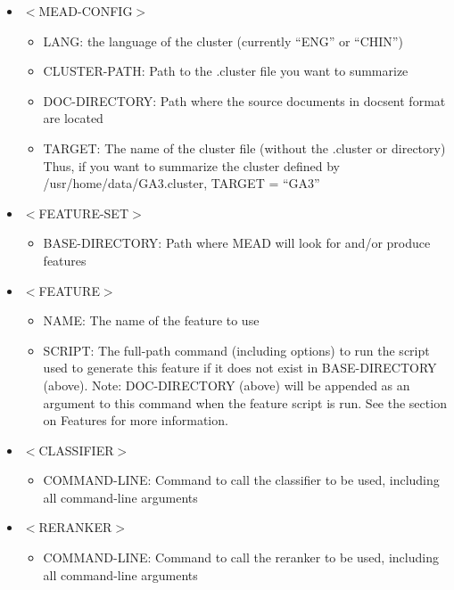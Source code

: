 \documentclass[10pt]{article}
\begin{document}
\begin{itemize}

\item $<$MEAD-CONFIG$>$

\begin{itemize}
\item LANG: the language of the cluster (currently ``ENG'' or ``CHIN'')
\item CLUSTER-PATH: Path to the .cluster file you want to summarize
\item DOC-DIRECTORY: Path where the source documents in docsent format are
located
\item TARGET: The name of the cluster file (without the .cluster or directory)\\
Thus, if you want to summarize the cluster defined by
/usr/home/data/GA3.cluster, TARGET = ``GA3''
\end{itemize}


\item $<$FEATURE-SET$>$

\begin{itemize}
\item BASE-DIRECTORY: Path where MEAD will look for and/or produce features
\end{itemize}


\item $<$FEATURE$>$

\begin{itemize}
\item NAME: The name of the feature to use
\item SCRIPT: The full-path command (including options) to run 
the script used to generate this feature if it does not exist in
BASE-DIRECTORY (above).  Note: DOC-DIRECTORY (above) will be
appended as an argument to
this command when the feature script is run.  See the section
on Features for more information.
\end{itemize}


\item $<$CLASSIFIER$>$

\begin{itemize}
\item COMMAND-LINE: Command to call the classifier to be used,
including all command-line arguments
\end{itemize}


\item $<$RERANKER$>$

\begin{itemize}
\item COMMAND-LINE: Command to call the reranker to be used,
including all command-line arguments
\end{itemize}



\end{itemize}
\end{document}
